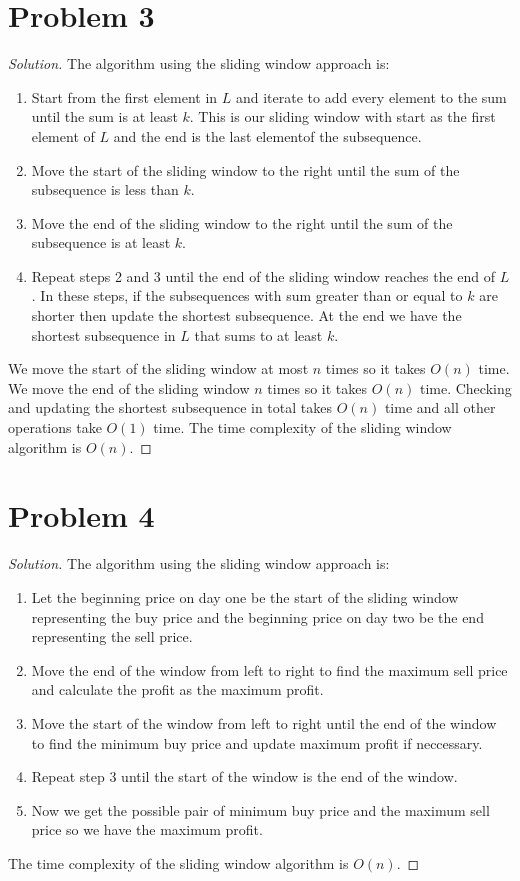 \documentclass[12pt]{article}
\newenvironment*{solution}{\begin{proof}[Solution]}{\end{proof}}
\begin{document}
\section*{Problem 3}
\begin{solution}
    The algorithm using the sliding window approach is:
    \begin{enumerate}
        \item Start from the first element in \(L\) and iterate to add every
        element to the sum until the sum is at least \(k\). This is our
        sliding window with start as the first element of \(L\) and the end is
        the last elementof the subsequence.
        \item Move the start of the sliding window to the right until the sum
        of the subsequence is less than \(k\).
        \item Move the end of the sliding window to the right until the sum of
        the subsequence is at least \(k\).
        \item Repeat steps 2 and 3 until the end of the sliding window reaches
        the end of \(L\). In these steps, if the subsequences with sum greater
        than or equal to \(k\) are shorter then update the shortest
        subsequence. At the end we have the shortest subsequence in \(L\) that
        sums to at least \(k\).
    \end{enumerate}
    We move the start of the sliding window at most \(n\) times so it takes
    \(O(n)\) time. We move the end of the sliding window \(n\) times so it
    takes \(O(n)\) time. Checking and updating the shortest subsequence in
    total takes \(O(n)\) time and all other operations take \(O(1)\) time. The
    time complexity of the sliding window algorithm is \(O(n)\).
\end{solution}
\section*{Problem 4}
\begin{solution}
    The algorithm using the sliding window approach is:
    \begin{enumerate}
        \item Let the beginning price on day one be the start of the sliding
        window representing the buy price and the beginning price on day two
        be the end representing the sell price.
        \item Move the end of the window from left to right to find the
        maximum sell price and calculate the profit as the maximum profit.
        \item Move the start of the window from left to right until the end of
        the window to find the minimum buy price and update maximum profit if
        neccessary.
        \item Repeat step 3 until the start of the window is the end of the
        window.
        \item Now we get the possible pair of minimum buy price and the
        maximum sell price so we have the maximum profit.
    \end{enumerate}
    The time complexity of the sliding window algorithm is \(O(n)\).
\end{solution}
\end{document}
